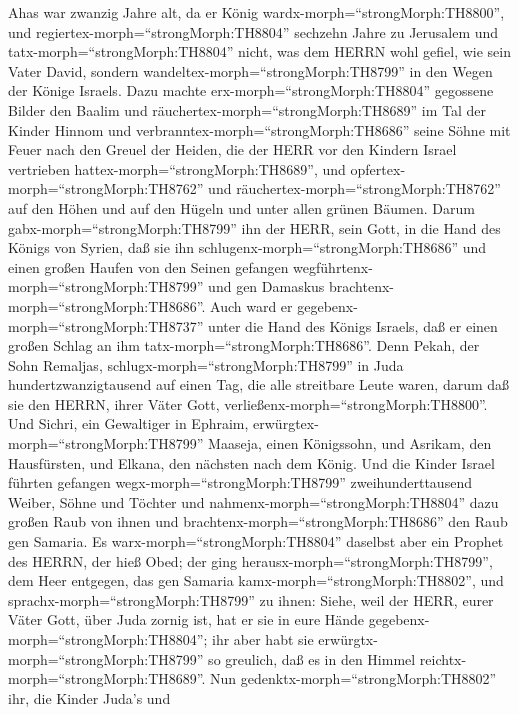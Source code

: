  Ahas war zwanzig Jahre alt, da er König
wardx-morph=``strongMorph:TH8800'', und
regiertex-morph=``strongMorph:TH8804'' sechzehn Jahre zu Jerusalem und
tatx-morph=``strongMorph:TH8804'' nicht, was dem HERRN wohl gefiel, wie
sein Vater David,  sondern
wandeltex-morph=``strongMorph:TH8799'' in den Wegen der Könige Israels.
Dazu machte erx-morph=``strongMorph:TH8804'' gegossene Bilder den Baalim
 und räuchertex-morph=``strongMorph:TH8689'' im Tal der
Kinder Hinnom und verbranntex-morph=``strongMorph:TH8686'' seine Söhne
mit Feuer nach den Greuel der Heiden, die der HERR vor den Kindern
Israel vertrieben hattex-morph=``strongMorph:TH8689'',  und
opfertex-morph=``strongMorph:TH8762'' und
räuchertex-morph=``strongMorph:TH8762'' auf den Höhen und auf den Hügeln
und unter allen grünen Bäumen.  Darum
gabx-morph=``strongMorph:TH8799'' ihn der HERR, sein Gott, in die Hand
des Königs von Syrien, daß sie ihn
schlugenx-morph=``strongMorph:TH8686'' und einen großen Haufen von den
Seinen gefangen wegführtenx-morph=``strongMorph:TH8799'' und gen
Damaskus brachtenx-morph=``strongMorph:TH8686''. Auch ward er
gegebenx-morph=``strongMorph:TH8737'' unter die Hand des Königs Israels,
daß er einen großen Schlag an ihm tatx-morph=``strongMorph:TH8686''.
 Denn Pekah, der Sohn Remaljas,
schlugx-morph=``strongMorph:TH8799'' in Juda hundertzwanzigtausend auf
einen Tag, die alle streitbare Leute waren, darum daß sie den HERRN,
ihrer Väter Gott, verließenx-morph=``strongMorph:TH8800''. 
Und Sichri, ein Gewaltiger in Ephraim,
erwürgtex-morph=``strongMorph:TH8799'' Maaseja, einen Königssohn, und
Asrikam, den Hausfürsten, und Elkana, den nächsten nach dem König.
 Und die Kinder Israel führten gefangen
wegx-morph=``strongMorph:TH8799'' zweihunderttausend Weiber, Söhne und
Töchter und nahmenx-morph=``strongMorph:TH8804'' dazu großen Raub von
ihnen und brachtenx-morph=``strongMorph:TH8686'' den Raub gen Samaria.
 Es warx-morph=``strongMorph:TH8804'' daselbst aber ein
Prophet des HERRN, der hieß Obed; der ging
herausx-morph=``strongMorph:TH8799'', dem Heer entgegen, das gen Samaria
kamx-morph=``strongMorph:TH8802'', und
sprachx-morph=``strongMorph:TH8799'' zu ihnen: Siehe, weil der HERR,
eurer Väter Gott, über Juda zornig ist, hat er sie in eure Hände
gegebenx-morph=``strongMorph:TH8804''; ihr aber habt sie
erwürgtx-morph=``strongMorph:TH8799'' so greulich, daß es in den Himmel
reichtx-morph=``strongMorph:TH8689''.  Nun
gedenktx-morph=``strongMorph:TH8802'' ihr, die Kinder Juda's und
